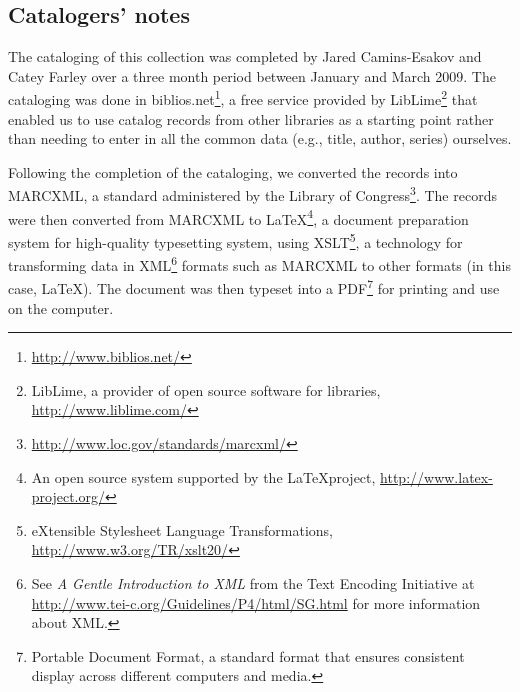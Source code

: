 \subsection*{Catalogers' notes}

The cataloging of this collection was completed by Jared Camins-Esakov and Catey
Farley over a three month period between January and March 2009. The cataloging
was done in {\ddag}biblios.net\footnote{\url{http://www.biblios.net/}}, a free
service provided by LibLime\footnote{LibLime, a provider of open source software
for libraries, \url{http://www.liblime.com/}} that enabled us to use catalog
records from other libraries as a starting point rather than needing to enter in
all the common data (e.g., title, author, series) ourselves.

Following the completion of the cataloging, we converted the records into MARCXML,
a standard administered by the Library of
Congress\footnote{\url{http://www.loc.gov/standards/marcxml/}}. The records were
then converted from MARCXML to \LaTeX\footnote{An open source system supported by
the \LaTeX project, \url{http://www.latex-project.org/}}, a document preparation
system for high-quality typesetting system, using XSLT\footnote{eXtensible
Stylesheet Language Transformations, \url{http://www.w3.org/TR/xslt20/}}, a
technology for transforming data in XML\footnote{See \emph{A Gentle Introduction
to XML} from the Text Encoding Initiative at
\url{http://www.tei-c.org/Guidelines/P4/html/SG.html} for more information about
XML.} formats such as MARCXML to other formats (in this case, \LaTeX). The document
was then typeset into a PDF\footnote{Portable Document Format, a standard format
that ensures consistent display across different computers and media.} for printing
and use on the computer.

